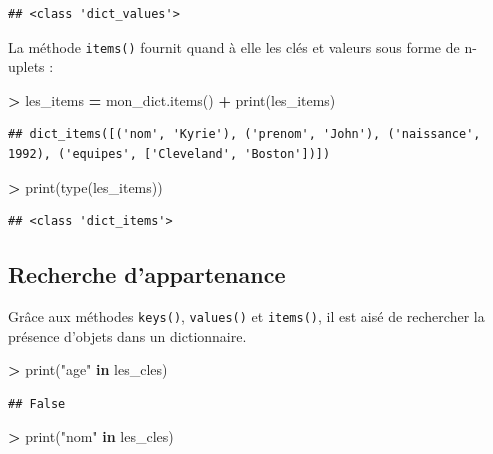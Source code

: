\documentclass[12pt,]{book}
\newenvironment{Shaded}{\begin{snugshade}}{\end{snugshade}}
\newcommand{\KeywordTok}[1]{\textcolor[rgb]{0.13,0.29,0.53}{\textbf{#1}}}
\newcommand{\StringTok}[1]{\textcolor[rgb]{0.31,0.60,0.02}{#1}}
\newcommand{\OperatorTok}[1]{\textcolor[rgb]{0.81,0.36,0.00}{\textbf{#1}}}
\newcommand{\BuiltInTok}[1]{#1}
\newcommand{\NormalTok}[1]{#1}
\numberwithin{equation}{section}
\numberwithin{countremarque}{section}
\begin{document}
\begin{lstlisting}
## <class 'dict_values'>
\end{lstlisting}

La méthode \texttt{items()} fournit quand à elle les clés et valeurs
sous forme de n-uplets :

\begin{Shaded}
\begin{Highlighting}[]
\OperatorTok{>}\NormalTok{ les_items }\OperatorTok{=}\NormalTok{ mon_dict.items()}
\OperatorTok{+} \BuiltInTok{print}\NormalTok{(les_items)}
\end{Highlighting}
\end{Shaded}

\begin{lstlisting}
## dict_items([('nom', 'Kyrie'), ('prenom', 'John'), ('naissance', 1992), ('equipes', ['Cleveland', 'Boston'])])
\end{lstlisting}

\begin{Shaded}
\begin{Highlighting}[]
\OperatorTok{>} \BuiltInTok{print}\NormalTok{(}\BuiltInTok{type}\NormalTok{(les_items))}
\end{Highlighting}
\end{Shaded}

\begin{lstlisting}
## <class 'dict_items'>
\end{lstlisting}

\subsection{Recherche d'appartenance}\label{recherche-dappartenance}

Grâce aux méthodes \texttt{keys()}, \texttt{values()} et
\texttt{items()}, il est aisé de rechercher la présence d'objets dans un
dictionnaire.

\begin{Shaded}
\begin{Highlighting}[]
\OperatorTok{>} \BuiltInTok{print}\NormalTok{(}\StringTok{"age"} \KeywordTok{in}\NormalTok{ les_cles)}
\end{Highlighting}
\end{Shaded}

\begin{lstlisting}
## False
\end{lstlisting}

\begin{Shaded}
\begin{Highlighting}[]
\OperatorTok{>} \BuiltInTok{print}\NormalTok{(}\StringTok{"nom"} \KeywordTok{in}\NormalTok{ les_cles)}
\end{Highlighting}
\end{Shaded}
\end{document}
